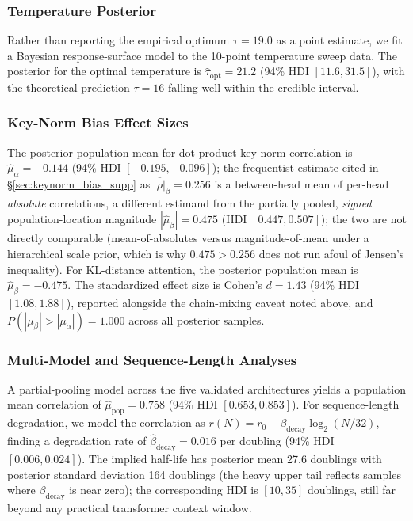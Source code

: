 \documentclass[twoside,11pt]{article}
\begin{document}
\subsubsection{Temperature Posterior}

Rather than reporting the empirical optimum $\tau = 19.0$ as a point estimate, we fit a Bayesian response-surface model to the 10-point temperature sweep data. The posterior for the optimal temperature is $\hat{\tau}_{\mathrm{opt}} = 21.2$ (94\% HDI $[11.6, 31.5]$), with the theoretical prediction $\tau = 16$ falling well within the credible interval.

\subsubsection{Key-Norm Bias Effect Sizes}

The posterior population mean for dot-product key-norm correlation is $\hat{\mu}_\alpha = -0.144$ (94\% HDI $[-0.195, -0.096]$); the frequentist estimate cited in \S\ref{sec:keynorm_bias_supp} as $\overline{|\rho|}_\beta = 0.256$ is a between-head mean of per-head \emph{absolute} correlations, a different estimand from the partially pooled, \emph{signed} population-location magnitude $|\hat\mu_\beta| = 0.475$ (HDI $[0.447, 0.507]$); the two are not directly comparable (mean-of-absolutes versus magnitude-of-mean under a hierarchical scale prior, which is why $0.475 > 0.256$ does not run afoul of Jensen's inequality). For KL-distance attention, the posterior population mean is $\hat{\mu}_\beta = -0.475$. The standardized effect size is Cohen's $d = 1.43$ (94\% HDI $[1.08, 1.88]$), reported alongside the chain-mixing caveat noted above, and $P(|\mu_\beta| > |\mu_\alpha|) = 1.000$ across all posterior samples.

\subsubsection{Multi-Model and Sequence-Length Analyses}

A partial-pooling model across the five validated architectures yields a population mean correlation of $\hat{\mu}_{\mathrm{pop}} = 0.758$ (94\% HDI $[0.653, 0.853]$). For sequence-length degradation, we model the correlation as $r(N) = r_0 - \beta_{\mathrm{decay}} \log_2(N/32)$, finding a degradation rate of $\hat{\beta}_{\mathrm{decay}} = 0.016$ per doubling (94\% HDI $[0.006, 0.024]$). The implied half-life has posterior mean 27.6 doublings with posterior standard deviation 164 doublings (the heavy upper tail reflects samples where $\beta_{\mathrm{decay}}$ is near zero); the corresponding HDI is $[10, 35]$ doublings, still far beyond any practical transformer context window.
\end{document}

